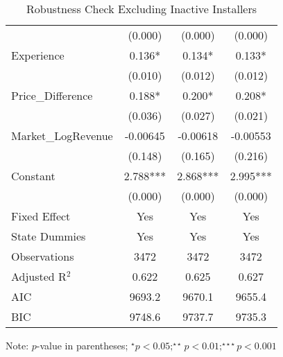\begin{table}[]
\begin{threeparttable}[t]
\begin{tabular}{@{}lccc@{}}
                                                     & (0.000)        & (0.000)        & (0.000)        \\
Experience                                           & 0.136*         & 0.134*         & 0.133*         \\
                                                     & (0.010)        & (0.012)        & (0.012)        \\
Price\_Difference                                    & 0.188*         & 0.200*         & 0.208*         \\
                                                     & (0.036)        & (0.027)        & (0.021)        \\
Market\_LogRevenue                                   & -0.00645       & -0.00618       & -0.00553       \\
                                                     & (0.148)        & (0.165)        & (0.216)        \\
Constant                                             & 2.788***       & 2.868***       & 2.995***       \\
                                                     & (0.000)        & (0.000)        & (0.000)        \\
Fixed Effect                                         & Yes            & Yes            & Yes            \\
State Dummies                                        & Yes            & Yes            & Yes            \\
Observations                                         & 3472           & 3472           & 3472           \\
Adjusted R$^2$                                          & 0.622          & 0.625          & 0.627          \\
AIC                                                  & 9693.2         & 9670.1         & 9655.4         \\
BIC                                                  & 9748.6         & 9737.7         & 9735.3         \\ \bottomrule
\end{tabular}%
\begin{tablenotes}
\item Note: $p$-value in parentheses; $^\star p<0.05;^{\star\star} p<0.01;^{\star\star\star} p<0.001 $
\end{tablenotes}
\caption{Robustness Check Excluding Inactive Installers}
\end{threeparttable}
\label{rob_exclude_inactive}
\end{table}